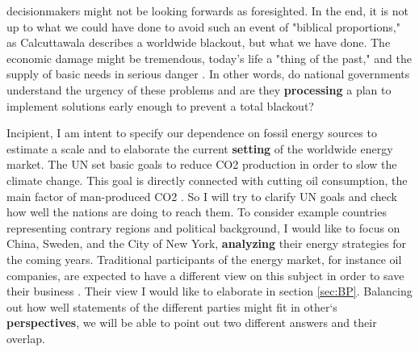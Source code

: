decisionmakers might not be looking forwards as foresighted.
In the end, it is not up to what we could have done to avoid such an event of "biblical proportions," as Calcuttawala describes a worldwide blackout\cite{Bible}, but what we have done.
The economic damage might be tremendous, today's life a "thing of the past," and the supply of basic needs in serious danger \cite{Bible}.
{\Large In other words}, do national governments understand the urgency of these problems and are they \textbf{processing} a plan to implement solutions early enough to prevent a total blackout? 
\par
Incipient, I am intent to specify our dependence on fossil energy sources to estimate a scale and to elaborate the current \textbf{setting} of the worldwide energy market.
The UN set basic goals to reduce CO2 production in order to slow the climate change. 
This goal is directly connected with cutting oil consumption, the main factor of man-produced CO2 \cite{OILCombustion}.
So I will try to clarify UN goals and check how well the nations are doing to reach them.
To consider example countries representing contrary regions and political background, I would like to
focus on China, Sweden, and the City of New York, \textbf{analyzing} their energy strategies for the coming years.
Traditional participants of the energy market, for instance oil companies, are expected to have a different view on this subject in order to save their business \cite{capitalism}.
Their view I would like to elaborate in section \ref{sec:BP}.
Balancing out how well statements of the different parties might fit in other`s \textbf{perspectives}, we will be able to point out two different answers and their overlap.
